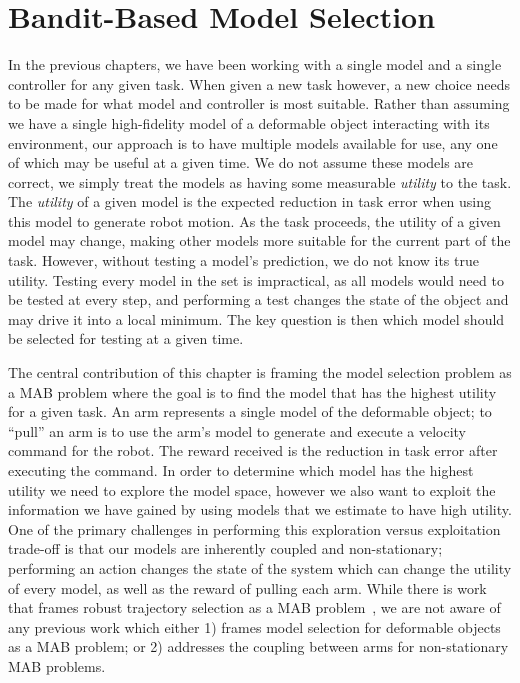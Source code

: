 \chapter{Bandit-Based Model Selection}

In the previous chapters, we have been working with a single model and a single controller for any given task. When given a new task however, a new choice needs to be made for what model and controller is most suitable. Rather than assuming we have a single high-fidelity model of a deformable object interacting with its environment, our approach is to have multiple models available for use, any one of which may be useful at a given time. We do not assume these models are correct, we simply treat the models as having some measurable \textit{utility} to the task. The \textit{utility} of a given model is the expected reduction in task error when using this model to generate robot motion. As the task proceeds, the utility of a given model may change, making other models more suitable for the current part of the task. However, without testing a model's prediction, we do not know its true utility. Testing every model in the set is impractical, as all models would need to be tested at every step, and performing a test changes the state of the object and may drive it into a local minimum. The key question is then which model should be selected for testing at a given time.

The central contribution of this chapter is framing the model selection problem as a \ac{MAB} problem where the goal is to find the model that has the highest utility for a given task. An arm represents a single model of the deformable object; to ``pull'' an arm is to use the arm's model to generate and execute a velocity command for the robot. The reward received is the reduction in task error after executing the command. In order to determine which model has the highest utility we need to explore the model space, however we also want to exploit the information we have gained by using models that we estimate to have high utility. One of the primary challenges in performing this exploration versus exploitation trade-off is that our models are inherently coupled and non-stationary; performing an action changes the state of the system which can change the utility of every model, as well as the reward of pulling each arm. While there is work that frames robust trajectory selection as a \ac{MAB} problem~\cite{Koval2015}, we are not aware of any previous work which either 1) frames model selection for deformable objects as a \ac{MAB} problem; or 2) addresses the coupling between arms for non-stationary \ac{MAB} problems.

